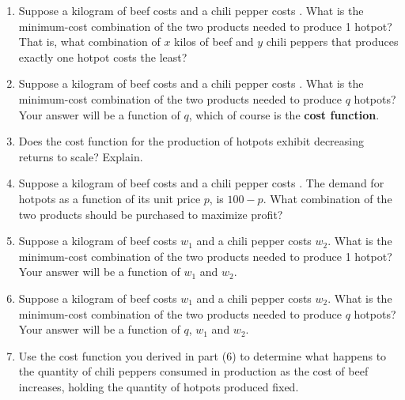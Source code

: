 \documentclass{article}
\begin{document}
\begin{enumerate}
\item Suppose a kilogram of beef costs  and a chili pepper costs . What is the minimum-cost combination of the two products needed to produce 1 hotpot? That is, what combination of $x$ kilos of beef and $y$ chili peppers that produces exactly one hotpot costs the least?
\item Suppose a kilogram of beef costs  and a chili pepper costs . What is the minimum-cost combination of the two products needed to produce $q$ hotpots? Your answer will be a function of $q$, which of course is the \textbf{cost function}.
\item Does the cost function for the production of hotpots exhibit decreasing returns to scale? Explain.
\item Suppose a kilogram of beef costs  and a chili pepper costs . The demand for hotpots as a function of its unit price $p$, is $100-p$. What combination of the two products should be purchased to maximize profit?
\item Suppose a kilogram of beef costs \yuan $w_1$ and a chili pepper costs \yuan $w_2$. What is the minimum-cost combination of the two products needed to produce 1 hotpot? Your answer will be a function of $w_1$ and $w_2$.
\item Suppose a kilogram of beef costs \yuan $w_1$ and a chili pepper costs \yuan $w_2$. What is the minimum-cost combination of the two products needed to produce $q$ hotpots? Your answer will be a function of $q$, $w_1$ and $w_2$.
\item Use the cost function you derived in part (6) to determine what happens to the quantity of chili peppers consumed in production as the cost of beef increases, holding the quantity of hotpots produced fixed.
\end{enumerate}
\end{document}
